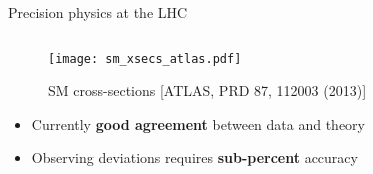 \begin{frame}[t]{Precision physics at the LHC}
  \vspace*{-0.8cm}
  \begin{columns}[t]
    \begin{column}{0.58\textwidth}
      \begin{figure}
        \centering
        \texttt{[image: sm\_xsecs\_atlas.pdf]}
        \caption*{SM cross-sections [ATLAS, PRD 87, 112003 (2013)]}
      \end{figure}
      \begin{itemize}
        \item Currently \textbf{good agreement} between data and theory
        \item Observing deviations requires \textbf{sub-percent} accuracy
      \end{itemize}
    \end{column}
    \begin{column}{0.38\textwidth}
      \vspace*{-0.5cm}
    \end{column}
  \end{columns}
\end{frame}


